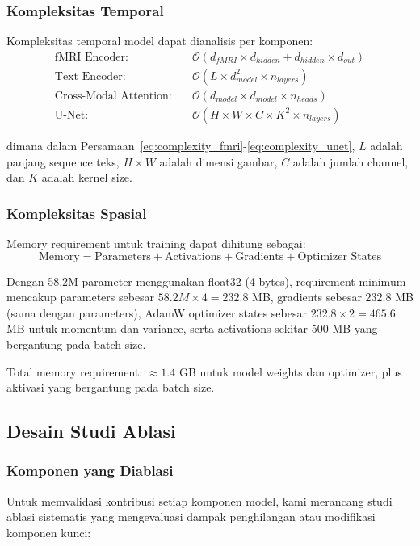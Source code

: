\subsubsection{Kompleksitas Temporal}
Kompleksitas temporal model dapat dianalisis per komponen:
\begin{align}
\text{fMRI Encoder:} \quad &\mathcal{O}(d_{fMRI} \times d_{hidden} + d_{hidden} \times d_{out}) \label{eq:complexity_fmri} \\
\text{Text Encoder:} \quad &\mathcal{O}(L \times d_{model}^2 \times n_{layers}) \label{eq:complexity_text} \\
\text{Cross-Modal Attention:} \quad &\mathcal{O}(d_{model} \times d_{model} \times n_{heads}) \label{eq:complexity_attention} \\
\text{U-Net:} \quad &\mathcal{O}(H \times W \times C \times K^2 \times n_{layers}) \label{eq:complexity_unet}
\end{align}

dimana dalam Persamaan~\ref{eq:complexity_fmri}-\ref{eq:complexity_unet}, $L$ adalah panjang sequence teks, $H \times W$ adalah dimensi gambar, $C$ adalah jumlah channel, dan $K$ adalah kernel size.

\subsubsection{Kompleksitas Spasial}
Memory requirement untuk training dapat dihitung sebagai:
\begin{equation}
\text{Memory} = \text{Parameters} + \text{Activations} + \text{Gradients} + \text{Optimizer States}
\label{eq:memory_requirement}
\end{equation}

Dengan 58.2M parameter menggunakan float32 (4 bytes), requirement minimum mencakup parameters sebesar $58.2M \times 4 = 232.8$ MB, gradients sebesar $232.8$ MB (sama dengan parameters), AdamW optimizer states sebesar $232.8 \times 2 = 465.6$ MB untuk momentum dan variance, serta activations sekitar $500$ MB yang bergantung pada batch size.

Total memory requirement: $\approx 1.4$ GB untuk model weights dan optimizer, plus aktivasi yang bergantung pada batch size.

\subsection{Desain Studi Ablasi}

\subsubsection{Komponen yang Diablasi}
Untuk memvalidasi kontribusi setiap komponen model, kami merancang studi ablasi sistematis yang mengevaluasi dampak penghilangan atau modifikasi komponen kunci:

